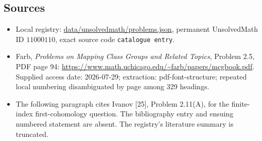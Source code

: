 \documentclass[11pt]{article}
\begin{document}
\subsection{Sources}
\begin{itemize}
\item Local registry: \url{data/unsolvedmath/problems.json}, permanent UnsolvedMath ID $11000110$, exact source code \texttt{catalogue entry}.
\item Farb, \emph{Problems on Mapping Class Groups and Related Topics}, Problem 2.5, PDF page 94: \url{https://www.math.uchicago.edu/~farb/papers/mcgbook.pdf}. Supplied access date: 2026-07-29; extraction: pdf-font-structure; repeated local numbering disambiguated by page among 329 headings.
\item The following paragraph cites Ivanov [25], Problem 2.11(A), for the finite-index first-cohomology question. The bibliography entry and ensuing numbered statement are absent. The registry's literature summary is truncated.
\end{itemize}
\end{document}
